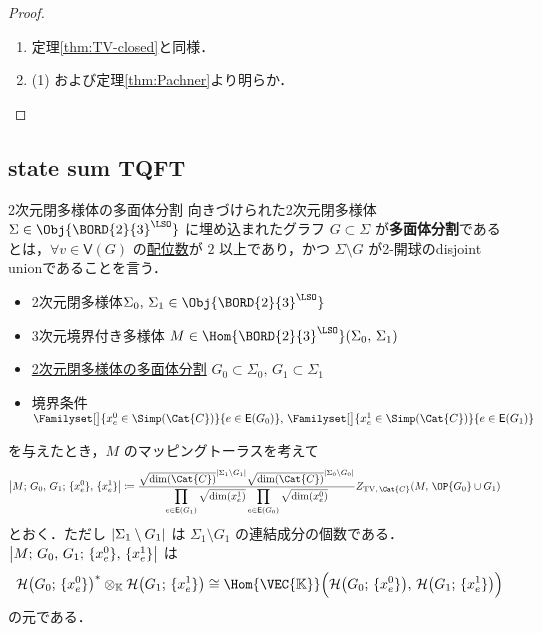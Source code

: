 \documentclass[TQFT_main]{subfiles}
\begin{document}
\begin{proof}
    \begin{enumerate}
        \item 定理\ref{thm:TV-closed}と同様．
        \item (1) および定理\ref{thm:Pachner}より明らか．
    \end{enumerate}
\end{proof}

\subsection{state sum TQFT}

\begin{mydef}[label=def:skeleton-2mfd]{2次元閉多様体の多面体分割}
    向きづけられた2次元閉多様体 $\Sigma \in \Obj{\BORD{2}{3}^{\LSO}}$ に埋め込まれたグラフ $G \subset \Sigma$ が\textbf{多面体分割}であるとは，$\forall v \in \mathsf{V}(G)$ の\hyperref[def:polyhedron]{配位数}が $2$ 以上であり，かつ $\Sigma \setminus G$ が2-開球のdisjoint unionであることを言う．
\end{mydef}

\begin{itemize}
    \item 2次元閉多様体$\Sigma_0,\,\Sigma_1 \in \Obj{\BORD{2}{3}^{\LSO}}$ 
    \item 3次元境界付き多様体 $M \in \Hom{\BORD{2}{3}^{\LSO}}(\Sigma_0,\, \Sigma_1)$
    \item \hyperref[def:skeleton-2mfd]{2次元閉多様体の多面体分割} $G_0 \subset \Sigma_0,\, G_1 \subset \Sigma_1$
    \item 境界条件 $\Familyset[\big]{x^0_e \in \Simp(\Cat{C})}{e \in \mathsf{E}(G_0)},\, \Familyset[\big]{x^1_e \in \Simp(\Cat{C})}{e \in \mathsf{E}(G_1)}$
\end{itemize}
を与えたとき，$M$ のマッピングトーラスを考えて
\begin{align}
    \label{eq:preTV-cob}
    \abs{M;\, G_0,\, G_1;\, \{x^0_e\},\, \{x^1_e\}} &\coloneqq \frac{\sqrt{\dim(\Cat{C})}^{\abs{\Sigma_1 \setminus G_1}} \sqrt{\dim(\Cat{C})}^{\abs{\Sigma_0 \setminus G_0}}}{\displaystyle\prod_{e \in \mathsf{E} (G_1)} \sqrt{\dim (x^1_e)} \prod_{e \in \mathsf{E} (G_0)} \sqrt{\dim (x^0_e)}} Z_{\text{TV},\, \Cat{C}} (M,\, \OP{G_0} \cup G_1)
\end{align}
とおく．ただし $\abs{\Sigma_1 \setminus G_1}$ は $\Sigma_1 \setminus G_1$ の連結成分の個数である．
$\abs{M;\, G_0,\, G_1;\, \{x^0_e\},\, \{x^1_e\}}$ は
\begin{align}
    \mathcal{H} \bigl( G_0;\, \{x^0_e\} \bigr)^{*} \otimes_{\mathbb{K}} \mathcal{H} \bigl( G_1;\, \{x^1_e\} \bigr) \cong \Hom{\VEC{\mathbb{K}}} \Bigl( \mathcal{H} \bigl( G_0;\, \{x^0_e\} \bigr),\, \mathcal{H} \bigl( G_1;\, \{x^1_e\} \bigr) \Bigr) 
\end{align}
の元である．
\end{document}
